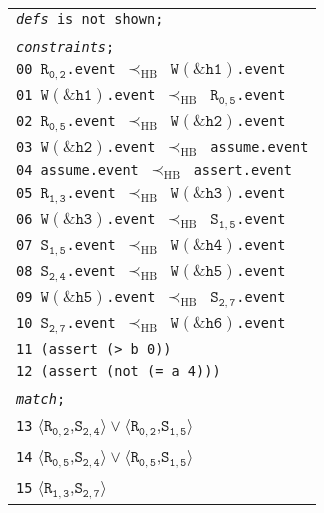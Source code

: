\newsavebox{\boxSMTc}
\begin{lrbox}{\boxSMTc}
\normalsize
\begin{tabular}[t]{l}
\texttt{\textit{defs} is not shown;}\\
\\
\texttt{\textit{constraints};}\\
\texttt{00 $\mathtt{R_{0,2}}$.event $\mathrm{\prec_{HB}}$ $\mathtt{W(\&h1)}$.event}\\
\texttt{01 $\mathtt{W(\&h1)}$.event $\mathrm{\prec_{HB}}$ $\mathtt{R_{0,5}}$.event}\\
\texttt{02 $\mathtt{R_{0,5}}$.event $\mathrm{\prec_{HB}}$ $\mathtt{W(\&h2)}$.event}\\
\texttt{03 $\mathtt{W(\&h2)}$.event $\mathrm{\prec_{HB}}$ assume.event}\\
\texttt{04 assume.event $\mathrm{\prec_{HB}}$ assert.event}\\
\texttt{05 $\mathtt{R_{1,3}}$.event $\mathrm{\prec_{HB}}$ $\mathtt{W(\&h3)}$.event}\\
\texttt{06 $\mathtt{W(\&h3)}$.event $\mathrm{\prec_{HB}}$ $\mathtt{S_{1,5}}$.event}\\
\texttt{07 $\mathtt{S_{1,5}}$.event $\mathrm{\prec_{HB}}$ $\mathtt{W(\&h4)}$.event}\\
\texttt{08 $\mathtt{S_{2,4}}$.event $\mathrm{\prec_{HB}}$ $\mathtt{W(\&h5)}$.event}\\
\texttt{09 $\mathtt{W(\&h5)}$.event $\mathrm{\prec_{HB}}$ $\mathtt{S_{2,7}}$.event}\\
\texttt{10 $\mathtt{S_{2,7}}$.event $\mathrm{\prec_{HB}}$ $\mathtt{W(\&h6)}$.event}\\
\texttt{11 (assert (> b 0))}\\
\texttt{12 (assert (not (= a 4)))}\\
\\
\texttt{\textit{match};}\\
\texttt{13} $\langle\mathtt{R_{0,2}}$,$\mathtt{S_{2,4}}\rangle\vee\langle\mathtt{R_{0,2}}$,$\mathtt{S_{1,5}}\rangle$\\
\texttt{14} $\langle\mathtt{R_{0,5}}$,$\mathtt{S_{2,4}}\rangle\vee\langle\mathtt{R_{0,5}}$,$\mathtt{S_{1,5}}\rangle$\\
\texttt{15} $\langle\mathtt{R_{1,3}}$,$\mathtt{S_{2,7}}\rangle$\\

\end{tabular}
\end{lrbox}


